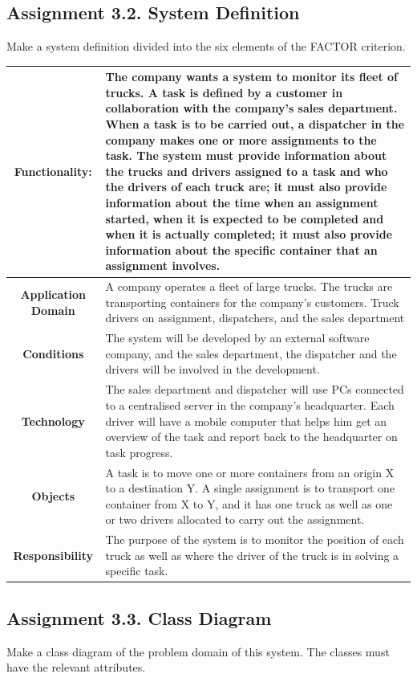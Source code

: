 \subsection{Assignment 3.2. System Definition}
Make a system definition divided into the six elements of the FACTOR criterion.
\begin{center}
    \begin{tabular}{|c|p{10cm}|}
    \hline
        \textbf{Functionality}: & The company wants a system to monitor its fleet of trucks. A task is defined by a customer in collaboration with the company’s sales department. When a task is to be carried out, a dispatcher in the company makes one or more assignments to the task. The system must provide information about the trucks and drivers assigned to a task and who the drivers of each truck are; it must also provide information about the time when an assignment started, when it is expected to be completed and when it is actually completed; it must also provide information about the specific container that an assignment involves. \\ \hline
        \textbf{Application Domain} & A company operates a fleet of large trucks. The trucks are transporting containers for the company’s customers. Truck drivers on assignment, dispatchers, and the sales department \\ \hline
        \textbf{Conditions} & The system will be developed by an external software company, and the sales department, the dispatcher and the drivers will be involved in the development. \\ \hline
        \textbf{Technology} & The sales department and dispatcher will use PCs connected to a centralised server in the company’s headquarter. Each driver will have a mobile computer that helps him get an overview of the task and report back to the headquarter on task progress. \\ \hline
        \textbf{Objects} & A task is to move one or more containers from an origin X to a destination Y.  A single assignment is to transport one container from X to Y, and it has one truck as well as one or two drivers allocated to carry out the assignment. \\ \hline
        \textbf{Responsibility} & The purpose of the system is to monitor the position of each truck as well as where the driver of the truck is in solving a specific task. \\ \hline
    \end{tabular}
\end{center}
\subsection{Assignment 3.3. Class Diagram}
Make a class diagram of the problem domain of this system. The classes must have the relevant attributes.

